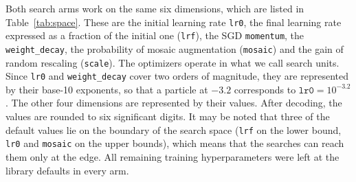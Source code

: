 Both search arms work on the same six dimensions, which are listed in Table~\ref{tab:space}. These are the initial learning rate \texttt{lr0}, the final learning rate expressed as a fraction of the initial one (\texttt{lrf}), the SGD \texttt{momentum}, the \texttt{weight\_decay}, the probability of mosaic augmentation (\texttt{mosaic}) and the gain of random rescaling (\texttt{scale}). The optimizers operate in what we call search units. Since \texttt{lr0} and \texttt{weight\_decay} cover two orders of magnitude, they are represented by their base-10 exponents, so that a particle at $-3.2$ corresponds to $\texttt{lr0}=10^{-3.2}$. The other four dimensions are represented by their values. After decoding, the values are rounded to six significant digits. It may be noted that three of the default values lie on the boundary of the search space (\texttt{lrf} on the lower bound, \texttt{lr0} and \texttt{mosaic} on the upper bounds), which means that the searches can reach them only at the edge. All remaining training hyperparameters were left at the library defaults in every arm.

